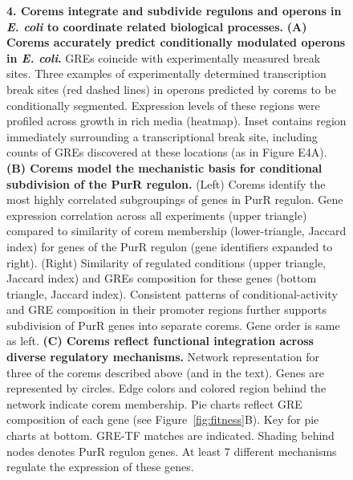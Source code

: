 \begin{figure}[!b]
\centering
{}
\caption{{\bf 4. Corems integrate and subdivide regulons and operons
    in {\it E. coli} to coordinate related biological processes.}  {\bf (A)
    Corems accurately predict conditionally modulated operons in
    {\it E. coli}.} GREs coincide with experimentally measured break
  sites. Three examples of experimentally determined transcription
  break sites (red dashed lines) in operons predicted by corems to be
  conditionally segmented. Expression levels of these regions were
  profiled across growth in rich media (heatmap). Inset contains
  region immediately surrounding a transcriptional break site,
  including counts of GREs discovered at these locations (as in Figure
  E4A). {\bf (B) Corems model the mechanistic basis for conditional
    subdivision of the PurR regulon.} (Left) Corems identify the most
  highly correlated subgroupings of genes in PurR regulon. Gene
  expression correlation across all experiments (upper triangle)
  compared to similarity of corem membership (lower-triangle, Jaccard
  index) for genes of the PurR regulon (gene identifiers expanded to
  right). (Right) Similarity of regulated conditions (upper triangle,
  Jaccard index) and GREs composition for these genes (bottom
  triangle, Jaccard index). Consistent patterns of
  conditional-activity and GRE composition in their promoter regions
  further supports subdivision of PurR genes into separate
  corems. Gene order is same as left. {\bf (C) Corems reflect
    functional integration across diverse regulatory mechanisms.}
  Network representation for three of the corems described above (and
  in the text). Genes are represented by circles. Edge colors and
  colored region behind the network indicate corem membership. Pie
  charts reflect GRE composition of each gene (see
  Figure~\ref{fig:fitness}B). Key for pie charts at bottom. GRE-TF
  matches are indicated. Shading behind nodes denotes PurR regulon
  genes. At least 7 different mechanisms regulate the expression of
  these genes.  }
\label{fig:corems}
\vspace{-.1in}
\end{figure}


